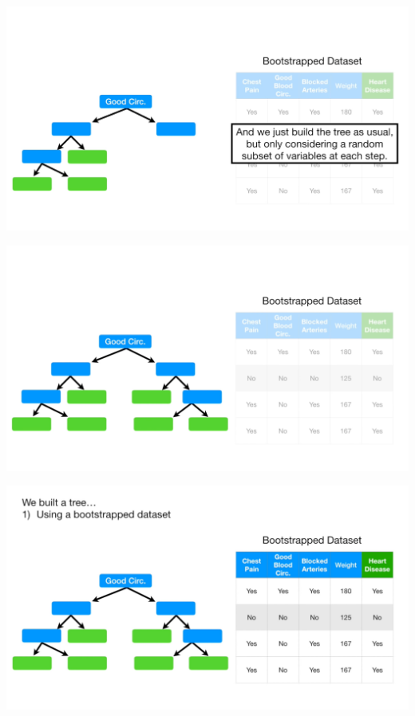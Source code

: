 \documentclass[
  ignorenonframetext,
]{beamer}
\begin{document}
\begin{frame}{}
\protect\hypertarget{section-32}{}
\includegraphics{images/r33.png}
\end{frame}

\begin{frame}{}
\protect\hypertarget{section-33}{}
\includegraphics{images/r34.png}
\end{frame}

\begin{frame}{}
\protect\hypertarget{section-34}{}
\includegraphics{images/r35.png}
\end{frame}
\end{document}
